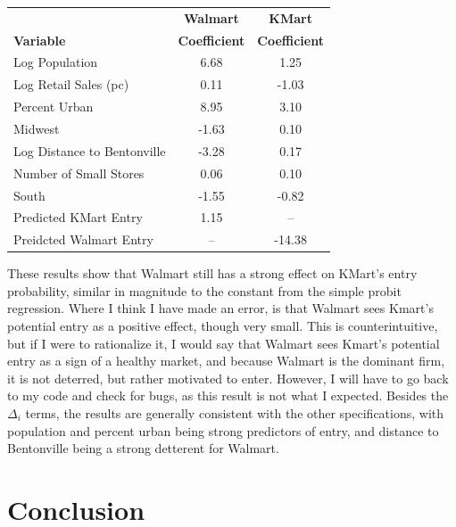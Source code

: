 \documentclass[11pt]{article}
\theoremstyle{definition}
\theoremstyle{remark}
\begin{document}
\begin{table}[H]
\centering
\begin{tabular}{lcc}
\toprule
 & \textbf{Walmart} & \textbf{KMart} \\
\textbf{Variable} & \textbf{Coefficient} & \textbf{Coefficient} \\
\midrule
Log Population & 6.68 & 1.25 \\
Log Retail Sales (pc) & 0.11 & -1.03 \\
Percent Urban & 8.95 & 3.10 \\
Midwest & -1.63 & 0.10 \\
Log Distance to Bentonville & -3.28 & 0.17 \\
Number of Small Stores & 0.06 & 0.10 \\
South & -1.55 & -0.82 \\
Predicted KMart Entry & 1.15 & -- \\
Preidcted Walmart Entry & -- & -14.38 \\
\bottomrule
\end{tabular}
\end{table}

These results show that Walmart still has a strong effect on KMart's entry probability, similar in magnitude to the constant from the simple probit regression. Where I think I have made an error, is that Walmart sees Kmart's potential entry as a positive effect, though very small. This is counterintuitive, but if I were to rationalize it, I would say that Walmart sees Kmart's potential entry as a sign of a healthy market, and because Walmart is the dominant firm, it is not deterred, but rather motivated to enter. However, I will have to go back to my code and check for bugs, as this result is not what I expected. Besides the $\Delta_i$ terms, the results are generally consistent with the other specifications, with population and percent urban being strong predictors of entry, and distance to Bentonville being a strong detterent for Walmart.


\section{Conclusion}
\end{document}
